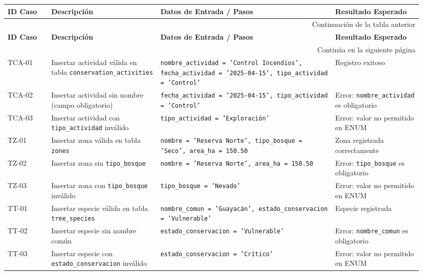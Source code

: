 \begin{longtable}{|p{0.1\linewidth}|p{0.25\linewidth}|p{0.4\linewidth}|p{0.2\linewidth}|}
\hline \textbf{ID Caso} & \textbf{Descripción} & \textbf{Datos de Entrada / Pasos} & \textbf{Resultado Esperado} \\ \hline \endfirsthead
\hline \multicolumn{4}{|r|}{{Continuación de la tabla anterior}} \\
\hline \textbf{ID Caso} & \textbf{Descripción} & \textbf{Datos de Entrada / Pasos} & \textbf{Resultado Esperado} \\ \hline \endhead
\hline \multicolumn{4}{|r|}{{Continúa en la siguiente página}} \\ \endfoot
\hline \endlastfoot
TCA-01 & Insertar actividad válida en tabla \texttt{conservation\_activities} & \texttt{nombre\_actividad = 'Control Incendios', fecha\_actividad = '2025-04-15', tipo\_actividad = 'Control'} & Registro exitoso \\ \hline
TCA-02 & Insertar actividad sin nombre (campo obligatorio) & \texttt{fecha\_actividad = '2025-04-15', tipo\_actividad = 'Control'} & Error: \texttt{nombre\_actividad} es obligatorio \\ \hline
TCA-03 & Insertar actividad con \texttt{tipo\_actividad} inválido & \texttt{tipo\_actividad = 'Exploración'} & Error: valor no permitido en ENUM \\ \hline
TZ-01 & Insertar zona válida en tabla \texttt{zones} & \texttt{nombre = 'Reserva Norte', tipo\_bosque = 'Seco', area\_ha = 150.50} & Zona registrada correctamente \\ \hline
TZ-02 & Insertar zona sin \texttt{tipo\_bosque} & \texttt{nombre = 'Reserva Norte', area\_ha = 150.50} & Error: \texttt{tipo\_bosque} es obligatorio \\ \hline
TZ-03 & Insertar zona con \texttt{tipo\_bosque} inválido & \texttt{tipo\_bosque = 'Nevado'} & Error: valor no permitido en ENUM \\ \hline
TT-01 & Insertar especie válida en tabla \texttt{tree\_species} & \texttt{nombre\_comun = 'Guayacán', estado\_conservacion = 'Vulnerable'} & Especie registrada \\ \hline
TT-02 & Insertar especie sin nombre común & \texttt{estado\_conservacion = 'Vulnerable'} & Error: \texttt{nombre\_comun} es obligatorio \\ \hline
TT-03 & Insertar especie con \texttt{estado\_conservacion} inválido & \texttt{estado\_conservacion = 'Crítico'} & Error: valor no permitido en ENUM \\ \hline
\end{longtable}

